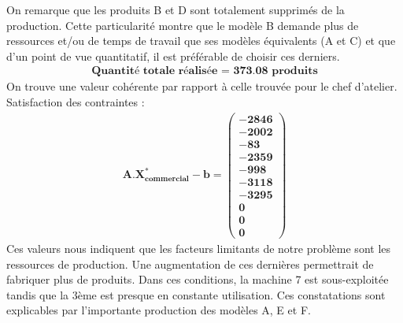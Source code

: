 \documentclass[12pt]{article}
\begin{document}
On remarque que les produits B et D sont totalement supprimés de la production. Cette particularité montre que le modèle B demande plus de ressources et/ou de temps de travail que ses modèles équivalents (A et C) et que d'un point de vue quantitatif, il est préférable de choisir ces derniers. 
\begin{align*}
\textbf{Quantité totale réalisée = 373.08 produits}
\end{align*}
On trouve une valeur cohérente par rapport à celle trouvée pour le chef d'atelier.\\
Satisfaction des contraintes : 
\begin{align*}
\boldsymbol{A.X^{*}_{commercial} - b = 
   \left (
   \begin{aligned}
      -2846 \\
      -2002 \\
      -83 \\
      -2359 \\
      -998 \\
      -3118 \\
      -3295 \\
      0 \\
      0 \\
      0
   \end{aligned}
   \right )
 } 
\end{align*}
Ces valeurs nous indiquent que les facteurs limitants de notre problème sont les ressources de production. Une augmentation de ces dernières permettrait de fabriquer plus de produits.
Dans ces conditions, la machine 7 est sous-exploitée tandis que la 3ème est presque en constante utilisation. Ces constatations sont explicables par l'importante production des modèles A, E et F. 
\end{document}
